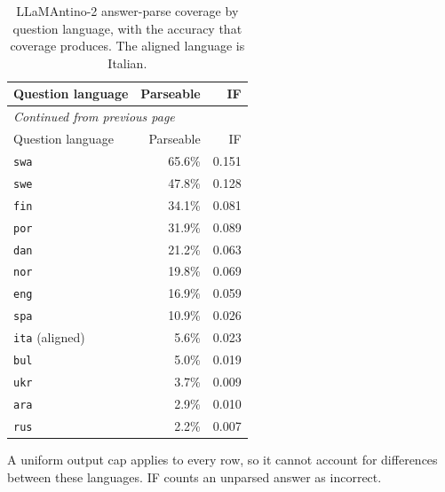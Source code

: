 \begingroup\footnotesize\setlength{\tabcolsep}{4pt}\renewcommand{\arraystretch}{1.15}
\begin{longtable}{lrr}
\caption[LLaMAntino-2 parse coverage by language]{LLaMAntino-2 answer-parse coverage by question language, with the accuracy that coverage produces. The aligned language is Italian.}\label{tab:belebele-parse-coverage}\\

\toprule
Question language & Parseable & IF\\
\midrule
\endfirsthead
\multicolumn{3}{l}{\textit{Continued from previous page}}\\
\toprule
Question language & Parseable & IF\\
\midrule
\endhead

\texttt{swa} & 65.6\% & 0.151\\
\texttt{swe} & 47.8\% & 0.128\\
\texttt{fin} & 34.1\% & 0.081\\
\texttt{por} & 31.9\% & 0.089\\
\texttt{dan} & 21.2\% & 0.063\\
\texttt{nor} & 19.8\% & 0.069\\
\texttt{eng} & 16.9\% & 0.059\\
\texttt{spa} & 10.9\% & 0.026\\
\texttt{ita} (aligned) & 5.6\% & 0.023\\
\texttt{bul} & 5.0\% & 0.019\\
\texttt{ukr} & 3.7\% & 0.009\\
\texttt{ara} & 2.9\% & 0.010\\
\texttt{rus} & 2.2\% & 0.007\\
\bottomrule
\end{longtable}

\par\smallskip\footnotesize A uniform output cap applies to every row, so it cannot account for differences between these languages. IF counts an unparsed answer as incorrect.

\endgroup


